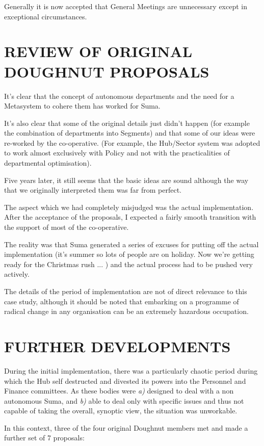 Generally it is now accepted that General Meetings are unnecessary except in exceptional circumstances.

\section*{REVIEW OF ORIGINAL DOUGHNUT PROPOSALS}
It's clear that the concept of autonomous departments and the need for a Metasystem to cohere them has worked for Suma.

It's also clear that some of the original details just didn't happen (for example the combination of departments into Segments) and that some of our ideas were re-worked by the co-operative. (For example, the Hub/Sector system was adopted to work almost exclusively with Policy and not with the practicalities of departmental optimisation).

Five years later, it still seems that the basic ideas are sound although the way that we originally interpreted them was far from perfect.

The aspect which we had completely misjudged was the actual implementation. After the acceptance of the proposals, I expected a fairly smooth transition with the support of most of the co-operative.

The reality was that Suma generated a series of excuses for putting off the actual implementation (it's summer so lots of people are on holiday. Now we're getting ready for the Christmas rush ... ) and the actual process had to be pushed very actively.

The details of the period of implementation are not of direct relevance to this case study, although it should be noted that embarking on a programme of radical change in any organisation can be an extremely hazardous occupation.

\section*{FURTHER DEVELOPMENTS}
During the initial implementation, there was a particularly chaotic period during which the Hub self destructed and divested its powers into the Personnel and Finance committees. As these bodies were \textit{a)} designed to deal with a non autonomous Suma, and \textit{b)} able to deal only with specific issues and thus not capable of taking the overall, synoptic view, the situation was unworkable.

In this context, three of the four original Doughnut members met and made a further set of 7 proposals:

